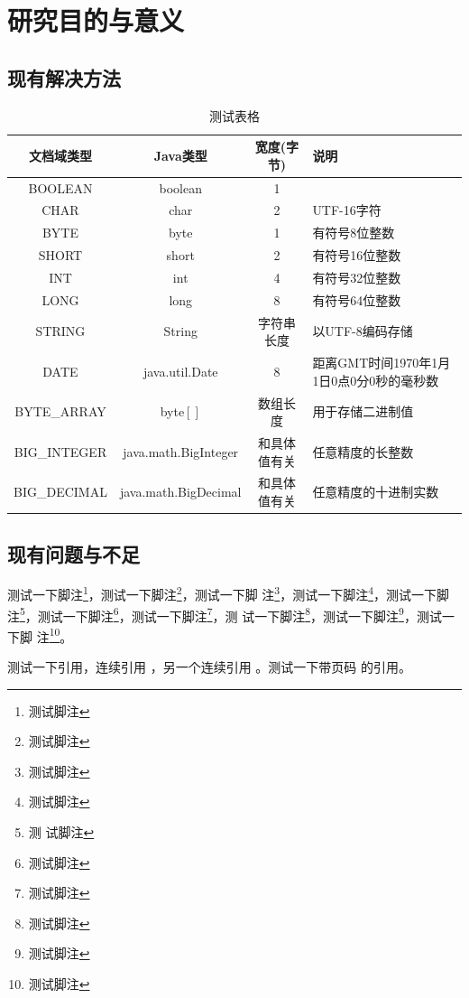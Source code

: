 \documentclass[phd,nobackinfo]{scutthesis}
\begin{document}
\section{研究目的与意义}
\subsection{现有解决方法}
\Blindtext
\begin{table}
  \centering
  \begin{tabular}{cccp{38mm}}
    \toprule
    \textbf{文档域类型} & \textbf{Java类型} & \textbf{宽度(字节)} & \textbf{说明} \\
    \midrule
    BOOLEAN  & boolean &  1  & \\
    CHAR     & char    &  2  & UTF-16字符 \\
    BYTE     & byte    &  1  & 有符号8位整数 \\
    SHORT    & short   &  2  & 有符号16位整数 \\
    INT      & int     &  4  & 有符号32位整数 \\
    LONG     & long    &  8  & 有符号64位整数 \\
    STRING   & String  &  字符串长度  & 以UTF-8编码存储 \\
    DATE     & java.util.Date & 8 & 距离GMT时间1970年1月1日0点0分0秒的毫秒数 \\
    BYTE\_ARRAY & byte$[]$ & 数组长度 & 用于存储二进制值 \\
    BIG\_INTEGER & java.math.BigInteger & 和具体值有关 & 任意精度的长整数 \\
    BIG\_DECIMAL & java.math.BigDecimal & 和具体值有关 & 任意精度的十进制实数 \\
    \bottomrule
  \end{tabular}
  \caption{测试表格}\label{table:test1}
\end{table}
\Blindtext
\subsection{现有问题与不足}

测试一下脚注\footnote{测试脚注}，测试一下脚注\footnote{测试脚注}，测试一下脚
注\footnote{测试脚注}，测试一下脚注\footnote{测试脚注}，测试一下脚注\footnote{测
  试脚注}，测试一下脚注\footnote{测试脚注}，测试一下脚注\footnote{测试脚注}，测
试一下脚注\footnote{测试脚注}，测试一下脚注\footnote{测试脚注}，测试一下脚
注\footnote{测试脚注}。

测试一下引用\cite{newman2006structure}，连续引用
\cite{newman2001random,aiello2000random,bollobas2001random}，另一个连续引用
\cite{newman2001random,bollobas2001random,barabasi1999emergence}。测试一下带页码
的引用\cite[124--128]{erdHos1961strength}。
\end{document}
